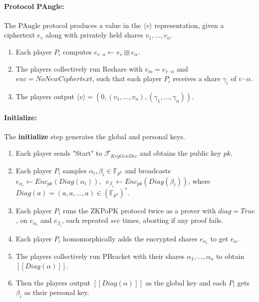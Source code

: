 \documentclass[../main.tex]{subfiles}
\begin{document}
\paragraph{Protocol PAngle:}
The PAngle protocol produces a value in the $\langle v \rangle$ representation, given a ciphertext $e_v$ along with privately held shares $v_1, ..., v_n$.
\begin{enumerate}
    \item Each player $P_i$ computes $e_{v \cdot a} \leftarrow e_v \boxplus e_\alpha$.
    \item The players collectively run Reshare with $e_m = e_{v \cdot \alpha}$ and $enc = NoNewCiphertext$, such that each player $P_i$ receives a share $\gamma_i$ of $v \cdot \alpha$.
    \item The players output $\langle v \rangle = (0, (v_1, ..., v_n), (\gamma_1, ..., \gamma_n))$.
\end{enumerate}

\paragraph{Initialize:}
The \textbf{initialize} step generates the global and personal keys.
\begin{enumerate}
    \item Each player sends "Start" to $\mathcal{F}_{KeyGenDec}$ and obtains the public key $pk$.
    \item Each player $P_i$ samples $\alpha_i, \beta_i \in \mathbb{F}_{p^k}$ and broadcasts $e_{\alpha_i} \leftarrow Enc_{pk}(Diag(\alpha_i)), \;\; e_{\beta_i} \leftarrow Enc_{pk}(Diag(\beta_i))$, where $Diag(a) = (a, a, ..., a) \in (\mathbb{F}_{p^k})^s$.
    \item Each player $P_i$ runs the ZKPoPK protocol twice as a prover with $diag = True$, on $e_{\alpha_i}$ and $e_{\beta_i}$, each repeated $sec$ times, aborting if any proof fails.
    \item Each player $P_i$ homomorphically adds the encrypted shares $e_{\alpha_i}$ to get $e_\alpha$.
    \item The players collectively run PBracket with their shares $\alpha_1, \dots, \alpha_n$ to obtain $[\![ Diag(\alpha) ]\!]$.
    \item Then the players output $[\![ Diag(\alpha) ]\!]$ as the global key and each $P_i$ gets $\beta_i$ as their personal key.
\end{enumerate}
\end{document}
